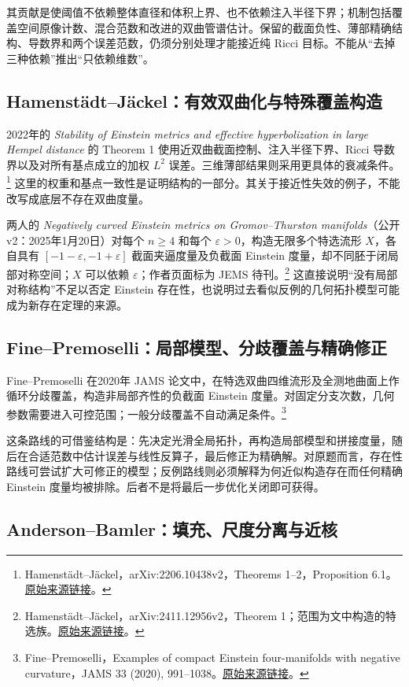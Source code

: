 \documentclass[11pt,a4paper]{article}
\theoremstyle{definition}
\newcommand{\src}[3]{\footnote{\raggedright #1，#2。\href{#3}{原始来源链接}。}}
\begin{document}
其贡献是使阈值不依赖整体直径和体积上界、也不依赖注入半径下界；机制包括覆盖空间原像计数、混合范数和改进的双曲管谱估计。保留的截面负性、薄部精确结构、导数界和两个误差范数，仍须分别处理才能接近纯 Ricci 目标。不能从“去掉三种依赖”推出“只依赖维数”。

\subsection{Hamenstädt--Jäckel：有效双曲化与特殊覆盖构造}

2022年的 \emph{Stability of Einstein metrics and effective hyperbolization in large Hempel distance} 的 Theorem 1 使用近双曲截面控制、注入半径下界、Ricci 导数界以及对所有基点成立的加权 $L^2$ 误差。三维薄部结果则采用更具体的衰减条件。\src{Hamenstädt--Jäckel}{arXiv:2206.10438v2，Theorems 1--2，Proposition 6.1}{https://arxiv.org/abs/2206.10438v2}
这里的权重和基点一致性是证明结构的一部分。其关于接近性失效的例子，不能改写成底层不存在双曲度量。

两人的 \emph{Negatively curved Einstein metrics on Gromov--Thurston manifolds}（公开 v2：2025年1月20日）对每个 $n\ge4$ 和每个 $\varepsilon>0$，构造无限多个特选流形 $X$，各自具有 $[-1-\varepsilon,-1+\varepsilon]$ 截面夹逼度量及负截面 Einstein 度量，却不同胚于闭局部对称空间；$X$ 可以依赖 $\varepsilon$；作者页面标为 JEMS 待刊。\src{Hamenstädt--Jäckel}{arXiv:2411.12956v2，Theorem 1；范围为文中构造的特选族}{https://arxiv.org/html/2411.12956v2}
这直接说明“没有局部对称结构”不足以否定 Einstein 存在性，也说明过去看似反例的几何拓扑模型可能成为新存在定理的来源。

\subsection{Fine--Premoselli：局部模型、分歧覆盖与精确修正}

Fine--Premoselli 在2020年 JAMS 论文中，在特选双曲四维流形及全测地曲面上作循环分歧覆盖，构造非局部齐性的负截面 Einstein 度量。对固定分支次数，几何参数需要进入可控范围；一般分歧覆盖不自动满足条件。\src{Fine--Premoselli}{Examples of compact Einstein four-manifolds with negative curvature，JAMS 33 (2020), 991--1038}{https://arxiv.org/abs/1802.00608}

这条路线的可借鉴结构是：先决定光滑全局拓扑，再构造局部模型和拼接度量，随后在合适范数中估计误差与线性反算子，最后修正为精确解。对原题而言，存在性路线可尝试扩大可修正的模型；反例路线则必须解释为何近似构造存在而任何精确 Einstein 度量均被排除。后者不是将最后一步优化关闭即可获得。

\subsection{Anderson--Bamler：填充、尺度分离与近核}
\end{document}
